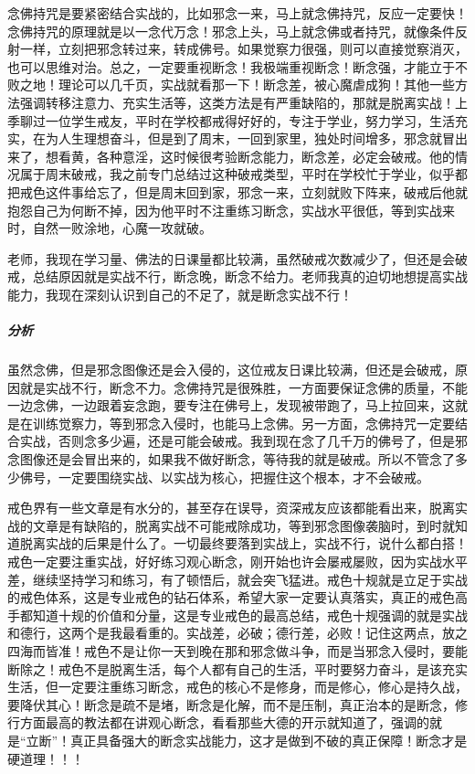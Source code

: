 念佛持咒是要紧密结合实战的，比如邪念一来，马上就念佛持咒，反应一定要快！念佛持咒的原理就是以一念代万念！邪念上头，马上就念佛或者持咒，就像条件反射一样，立刻把邪念转过来，转成佛号。如果觉察力很强，则可以直接觉察消灭，也可以思维对治。总之，一定要重视断念！我极端重视断念！断念强，才能立于不败之地！理论可以几千页，实战就看那一下！断念差，被心魔虐成狗！其他一些方法强调转移注意力、充实生活等，这类方法是有严重缺陷的，那就是脱离实战！上季聊过一位学生戒友，平时在学校都戒得好好的，专注于学业，努力学习，生活充实，在为人生理想奋斗，但是到了周末，一回到家里，独处时间增多，邪念就冒出来了，想看黄，各种意淫，这时候很考验断念能力，断念差，必定会破戒。他的情况属于周末破戒，我之前专门总结过这种破戒类型，平时在学校忙于学业，似乎都把戒色这件事给忘了，但是周末回到家，邪念一来，立刻就败下阵来，破戒后他就抱怨自己为何断不掉，因为他平时不注重练习断念，实战水平很低，等到实战来时，自然一败涂地，心魔一攻就破。

\begin{case}
    老师，我现在学习量、佛法的日课量都比较满，虽然破戒次数减少了，但还是会破戒，总结原因就是实战不行，断念晚，断念不给力。老师我真的迫切地想提高实战能力，我现在深刻认识到自己的不足了，就是断念实战不行！
    \subparagraph{分析} 虽然念佛，但是邪念图像还是会入侵的，这位戒友日课比较满，但还是会破戒，原因就是实战不行，断念不力。念佛持咒是很殊胜，一方面要保证念佛的质量，不能一边念佛，一边跟着妄念跑，要专注在佛号上，发现被带跑了，马上拉回来，这就是在训练觉察力，等到邪念入侵时，也能马上念佛。另一方面，念佛持咒一定要结合实战，否则念多少遍，还是可能会破戒。我到现在念了几千万的佛号了，但是邪念图像还是会冒出来的，如果我不做好断念，等待我的就是破戒。所以不管念了多少佛号，一定要围绕实战、以实战为核心，把握住这个根本，才不会破戒。
\end{case}

戒色界有一些文章是有水分的，甚至存在误导，资深戒友应该都能看出来，脱离实战的文章是有缺陷的，脱离实战不可能戒除成功，等到邪念图像袭脑时，到时就知道脱离实战的后果是什么了。一切最终要落到实战上，实战不行，说什么都白搭！戒色一定要注重实战，好好练习观心断念，刚开始也许会屡戒屡败，因为实战水平差，继续坚持学习和练习，有了顿悟后，就会突飞猛进。戒色十规就是立足于实战的戒色体系，这是专业戒色的钻石体系，希望大家一定要认真落实，真正的戒色高手都知道十规的价值和分量，这是专业戒色的最高总结，戒色十规强调的就是实战和德行，这两个是我最看重的。实战差，必破；德行差，必败！记住这两点，放之四海而皆准！戒色不是让你一天到晚在那和邪念做斗争，而是当邪念入侵时，要能断除之！戒色不是脱离生活，每个人都有自己的生活，平时要努力奋斗，是该充实生活，但一定要注重练习断念，戒色的核心不是修身，而是修心，修心是持久战，要降伏其心！断念是疏不是堵，断念是化解，而不是压制，真正治本的是断念，修行方面最高的教法都在讲观心断念，看看那些大德的开示就知道了，强调的就是“立断”！真正具备强大的断念实战能力，这才是做到不破的真正保障！断念才是硬道理！！！

